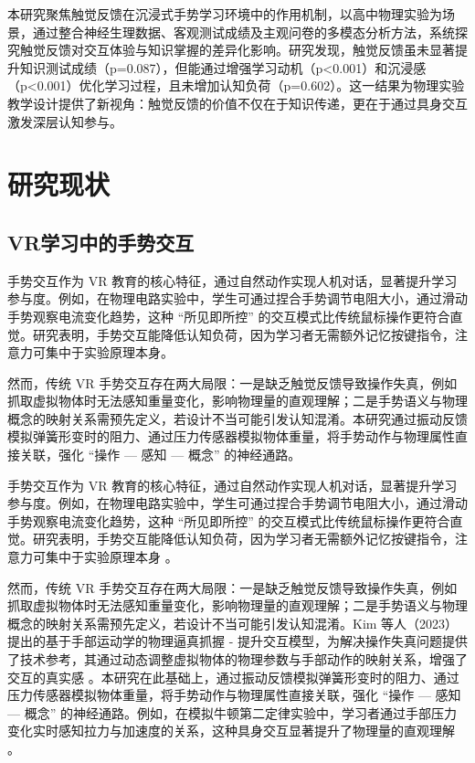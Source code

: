 \documentclass[runningheads]{llncs}
\begin{document}
本研究聚焦触觉反馈在沉浸式手势学习环境中的作用机制，以高中物理实验为场景，通过整合神经生理数据、客观测试成绩及主观问卷的多模态分析方法，系统探究触觉反馈对交互体验与知识掌握的差异化影响。研究发现，触觉反馈虽未显著提升知识测试成绩（p=0.087），但能通过增强学习动机（p<0.001）和沉浸感（p<0.001）优化学习过程，且未增加认知负荷（p=0.602）。这一结果为物理实验教学设计提供了新视角：触觉反馈的价值不仅在于知识传递，更在于通过具身交互激发深层认知参与。


\section{研究现状}
\subsection{VR学习中的手势交互} 
手势交互作为 VR 教育的核心特征，通过自然动作实现人机对话，显著提升学习参与度。例如，在物理电路实验中，学生可通过捏合手势调节电阻大小，通过滑动手势观察电流变化趋势，这种 “所见即所控” 的交互模式比传统鼠标操作更符合直觉。研究表明，手势交互能降低认知负荷，因为学习者无需额外记忆按键指令，注意力可集中于实验原理本身。

然而，传统 VR 手势交互存在两大局限：一是缺乏触觉反馈导致操作失真，例如抓取虚拟物体时无法感知重量变化，影响物理量的直观理解；二是手势语义与物理概念的映射关系需预先定义，若设计不当可能引发认知混淆。本研究通过振动反馈模拟弹簧形变时的阻力、通过压力传感器模拟物体重量，将手势动作与物理属性直接关联，强化 “操作 — 感知 — 概念” 的神经通路。

手势交互作为 VR 教育的核心特征，通过自然动作实现人机对话，显著提升学习参与度。例如，在物理电路实验中，学生可通过捏合手势调节电阻大小，通过滑动手势观察电流变化趋势，这种 “所见即所控” 的交互模式比传统鼠标操作更符合直觉。研究表明，手势交互能降低认知负荷，因为学习者无需额外记忆按键指令，注意力可集中于实验原理本身 \cite {xu2024virtual}。

然而，传统 VR 手势交互存在两大局限：一是缺乏触觉反馈导致操作失真，例如抓取虚拟物体时无法感知重量变化，影响物理量的直观理解；二是手势语义与物理概念的映射关系需预先定义，若设计不当可能引发认知混淆。Kim 等人（2023）提出的基于手部运动学的物理逼真抓握 - 提升交互模型，为解决操作失真问题提供了技术参考，其通过动态调整虚拟物体的物理参数与手部动作的映射关系，增强了交互的真实感 \cite {kim2023physically}。本研究在此基础上，通过振动反馈模拟弹簧形变时的阻力、通过压力传感器模拟物体重量，将手势动作与物理属性直接关联，强化 “操作 — 感知 — 概念” 的神经通路。例如，在模拟牛顿第二定律实验中，学习者通过手部压力变化实时感知拉力与加速度的关系，这种具身交互显著提升了物理量的直观理解 \cite {xu2024virtual}。
\end{document}
